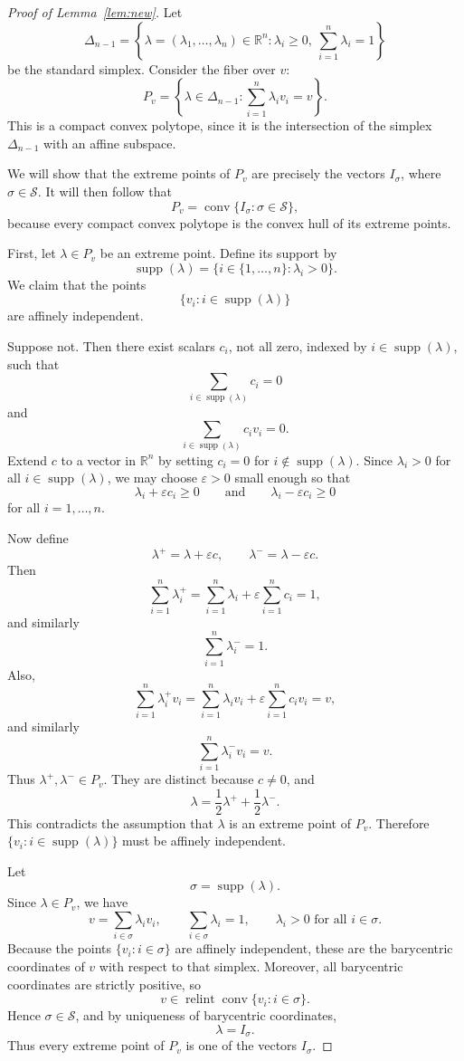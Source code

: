 \documentclass[10pt]{amsart}
\theoremstyle{plain}
\theoremstyle{definition}
\let\geq\geqslant
\begin{document}
\begin{proof}[Proof of Lemma~\ref{lem:new}]
Let
\[
\Delta_{n-1}
=
\left\{
\lambda=(\lambda_1,\ldots,\lambda_n)\in \mathbb R^n :
\lambda_i\geq 0,\ \sum_{i=1}^n \lambda_i=1
\right\}
\]
be the standard simplex. Consider the fiber over \(v\):
\[
P_v
=
\left\{
\lambda\in \Delta_{n-1} :
\sum_{i=1}^n \lambda_i v_i=v
\right\}.
\]
This is a compact convex polytope, since it is the intersection of the
simplex \(\Delta_{n-1}\) with an affine subspace.

We will show that the extreme points of \(P_v\) are precisely the vectors
\(I_\sigma\), where \(\sigma\in\mathcal S\). It will then follow that
\[
P_v=\operatorname{conv}\{I_\sigma : \sigma\in\mathcal S\},
\]
because every compact convex polytope is the convex hull of its extreme
points.

First, let \(\lambda\in P_v\) be an extreme point. Define its support by
\[
\operatorname{supp}(\lambda)
=
\{i\in\{1,\ldots,n\}:\lambda_i>0\}.
\]
We claim that the points
\[
\{v_i : i\in \operatorname{supp}(\lambda)\}
\]
are affinely independent.

Suppose not. Then there exist scalars \(c_i\), not all zero, indexed by
\(i\in \operatorname{supp}(\lambda)\), such that
\[
\sum_{i\in \operatorname{supp}(\lambda)} c_i=0
\]
and
\[
\sum_{i\in \operatorname{supp}(\lambda)} c_i v_i=0.
\]
Extend \(c\) to a vector in \(\mathbb R^n\) by setting \(c_i=0\) for
\(i\notin \operatorname{supp}(\lambda)\). Since \(\lambda_i>0\) for all
\(i\in \operatorname{supp}(\lambda)\), we may choose \(\varepsilon>0\)
small enough so that
\[
\lambda_i+\varepsilon c_i\geq 0
\qquad\text{and}\qquad
\lambda_i-\varepsilon c_i\geq 0
\]
for all \(i=1,\ldots,n\).

Now define
\[
\lambda^+=\lambda+\varepsilon c,
\qquad
\lambda^-=\lambda-\varepsilon c.
\]
Then
\[
\sum_{i=1}^n \lambda_i^+
=
\sum_{i=1}^n \lambda_i+\varepsilon\sum_{i=1}^n c_i
=
1,
\]
and similarly
\[
\sum_{i=1}^n \lambda_i^-=1.
\]
Also,
\[
\sum_{i=1}^n \lambda_i^+ v_i
=
\sum_{i=1}^n \lambda_i v_i
+
\varepsilon\sum_{i=1}^n c_i v_i
=
v,
\]
and similarly
\[
\sum_{i=1}^n \lambda_i^- v_i=v.
\]
Thus \(\lambda^+,\lambda^-\in P_v\). They are distinct because \(c\neq 0\),
and
\[
\lambda=\frac{1}{2}\lambda^+ + \frac{1}{2}\lambda^-.
\]
This contradicts the assumption that \(\lambda\) is an extreme point of
\(P_v\). Therefore \(\{v_i : i\in \operatorname{supp}(\lambda)\}\) must be
affinely independent.

Let
\[
\sigma=\operatorname{supp}(\lambda).
\]
Since \(\lambda\in P_v\), we have
\[
v=\sum_{i\in\sigma} \lambda_i v_i,
\qquad
\sum_{i\in\sigma}\lambda_i=1,
\qquad
\lambda_i>0 \text{ for all } i\in\sigma.
\]
Because the points \(\{v_i:i\in\sigma\}\) are affinely independent, these
are the barycentric coordinates of \(v\) with respect to that simplex.
Moreover, all barycentric coordinates are strictly positive, so
\[
v\in \operatorname{relint}\operatorname{conv}\{v_i:i\in\sigma\}.
\]
Hence \(\sigma\in\mathcal S\), and by uniqueness of barycentric
coordinates,
\[
\lambda=I_\sigma.
\]
Thus every extreme point of \(P_v\) is one of the vectors \(I_\sigma\).


\end{proof}
\end{document}
